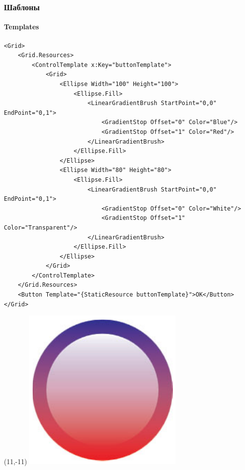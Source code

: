 \documentclass[xetex,mathserif,serif]{beamer}
\begin{document}
	\begin{frame}[fragile]
		\frametitle{Шаблоны}
		\framesubtitle{Templates}
		\begin{ssmall}
			\begin{verbatim}
<Grid>
    <Grid.Resources>
        <ControlTemplate x:Key="buttonTemplate">
            <Grid>
                <Ellipse Width="100" Height="100">
                    <Ellipse.Fill>
                        <LinearGradientBrush StartPoint="0,0" EndPoint="0,1">
                            <GradientStop Offset="0" Color="Blue"/>
                            <GradientStop Offset="1" Color="Red"/>
                        </LinearGradientBrush>
                    </Ellipse.Fill>
                </Ellipse>
                <Ellipse Width="80" Height="80">
                    <Ellipse.Fill>
                        <LinearGradientBrush StartPoint="0,0" EndPoint="0,1">
                            <GradientStop Offset="0" Color="White"/>
                            <GradientStop Offset="1" Color="Transparent"/>
                        </LinearGradientBrush>
                    </Ellipse.Fill>
                </Ellipse>
            </Grid>
        </ControlTemplate>
    </Grid.Resources>
    <Button Template="{StaticResource buttonTemplate}">OK</Button>
</Grid>
			\end{verbatim}
		\end{ssmall}
		\begin{textblock}{2}(11,-11)
			\includegraphics[width=\textwidth]{templatedButton.png}
		\end{textblock}
	\end{frame}
\end{document}
